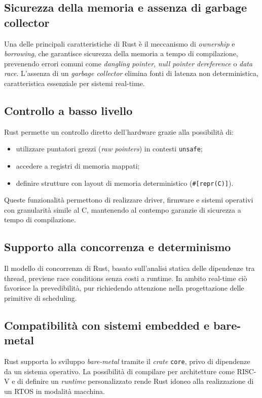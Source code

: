 \documentclass[italian, Lau, oneside]{sapthesis} %
\begin{document}
\subsection{Sicurezza della memoria e assenza di garbage collector}
Una delle principali caratteristiche di Rust è il meccanismo di \emph{ownership} e \emph{borrowing}, che garantisce sicurezza della memoria a tempo di compilazione, prevenendo errori comuni come \emph{dangling pointer}, \emph{null pointer dereference} o \emph{data race}.  
L’assenza di un \emph{garbage collector} elimina fonti di latenza non deterministica, caratteristica essenziale per sistemi real-time.

\subsection{Controllo a basso livello}
Rust permette un controllo diretto dell’hardware grazie alla possibilità di:
\begin{itemize}
    \item utilizzare puntatori grezzi (\emph{raw pointers}) in contesti \texttt{unsafe};
    \item accedere a registri di memoria mappati;
    \item definire strutture con layout di memoria deterministico (\texttt{\#[repr(C)]}).
\end{itemize}
Queste funzionalità permettono di realizzare driver, firmware e sistemi operativi con granularità simile al C, mantenendo al contempo garanzie di sicurezza a tempo di compilazione.

\subsection{Supporto alla concorrenza e determinismo}
Il modello di concorrenza di Rust, basato sull’analisi statica delle dipendenze tra thread, previene race conditions senza costi a runtime. In ambito real-time ciò favorisce la prevedibilità, pur richiedendo attenzione nella progettazione delle primitive di scheduling.

\subsection{Compatibilità con sistemi embedded e bare-metal}
Rust supporta lo sviluppo \emph{bare-metal} tramite il \emph{crate} \texttt{core}, privo di dipendenze da un sistema operativo. La possibilità di compilare per architetture come RISC-V e di definire un \emph{runtime} personalizzato rende Rust idoneo alla realizzazione di un RTOS in modalità macchina.
\end{document}
